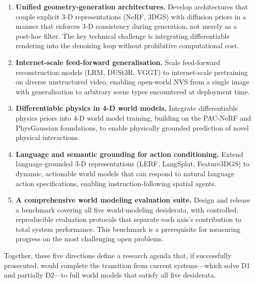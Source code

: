 \begin{enumerate}[leftmargin=*,label=\textbf{R\arabic*.}]
  \item \textbf{Unified geometry-generation architectures.}
    Develop architectures that couple explicit 3-D representations
    (NeRF, 3DGS) with diffusion priors in a manner that enforces
    3-D consistency during generation, not merely as a post-hoc filter.
    The key technical challenge is integrating differentiable rendering into
    the denoising loop without prohibitive computational cost.

  \item \textbf{Internet-scale feed-forward generalisation.}
    Scale feed-forward reconstruction models (LRM, DUSt3R, VGGT) to
    internet-scale pretraining on diverse unstructured video, enabling
    open-world NVS from a single image with generalisation to arbitrary
    scene types encountered at deployment time.

  \item \textbf{Differentiable physics in 4-D world models.}
    Integrate differentiable physics priors into 4-D world model training,
    building on the PAC-NeRF and PhysGaussian foundations, to enable
    physically grounded prediction of novel physical interactions.

  \item \textbf{Language and semantic grounding for action conditioning.}
    Extend language-grounded 3-D representations (LERF, LangSplat, Feature3DGS)
    to dynamic, actionable world models that can respond to natural language
    action specifications, enabling instruction-following spatial agents.

  \item \textbf{A comprehensive world modeling evaluation suite.}
    Design and release a benchmark covering all five world-modeling
    desiderata, with controlled, reproducible evaluation protocols
    that separate each axis's contribution to total system performance.
    This benchmark is a prerequisite for measuring progress on the
    most challenging open problems.
\end{enumerate}

Together, these five directions define a research agenda that, if successfully
prosecuted, would complete the transition from current \nvs{} systems---which
solve D1 and partially D2---to full world models that satisfy all five desiderata.

